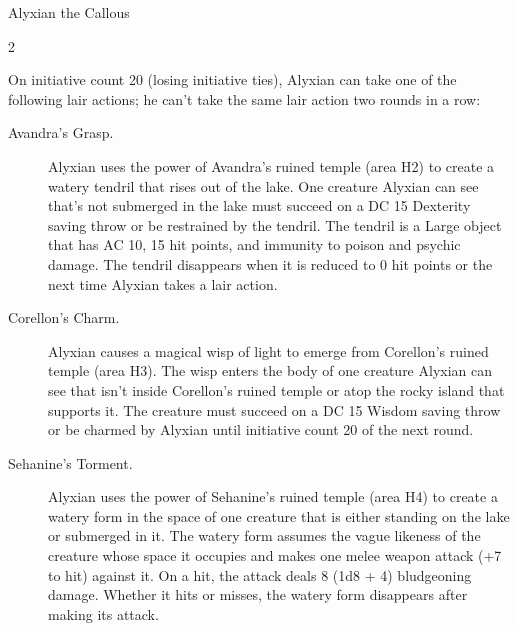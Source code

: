 \documentclass[10pt,a4paper,twoside,fancy,bg=print,twocolumn,openany,nodeprecatedcode]{dndbook}
\begin{document}
\begin{DndMonster}[float*=b,width=\textwidth + 8pt]{Alyxian the Callous}
\begin{multicols}{2}
\begin{DndMonsterLegendaryActions}
\end{DndMonsterLegendaryActions}
On initiative count 20 (losing initiative ties), Alyxian can take one of the following lair actions; he can't take the same lair action two rounds in a row:


\begin{description}
\item[Avandra's Grasp.]
Alyxian uses the power of Avandra's ruined temple (area H2) to create a watery tendril that rises out of the lake. One creature Alyxian can see that's not submerged in the lake must succeed on a DC 15 Dexterity saving throw or be restrained by the tendril. The tendril is a Large object that has AC 10, 15 hit points, and immunity to poison and psychic damage. The tendril disappears when it is reduced to 0 hit points or the next time Alyxian takes a lair action.

\item[Corellon's Charm.]
Alyxian causes a magical wisp of light to emerge from Corellon's ruined temple (area H3). The wisp enters the body of one creature Alyxian can see that isn't inside Corellon's ruined temple or atop the rocky island that supports it. The creature must succeed on a DC 15 Wisdom saving throw or be charmed by Alyxian until initiative count 20 of the next round.

\item[Sehanine's Torment.]
Alyxian uses the power of Sehanine's ruined temple (area H4) to create a watery form in the space of one creature that is either standing on the lake or submerged in it. The watery form assumes the vague likeness of the creature whose space it occupies and makes one melee weapon attack (+7 to hit) against it. On a hit, the attack deals 8 (1d8 + 4) bludgeoning damage. Whether it hits or misses, the watery form disappears after making its attack.


\end{description}
\end{multicols}
\end{DndMonster}
\end{document}
